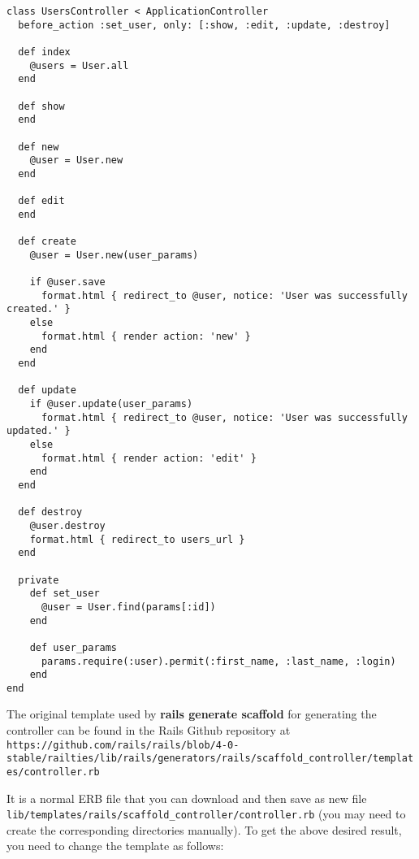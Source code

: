 \documentclass[a4paper]{book}
\newcounter{tab}[chapter]
\begin{document}
\begin{shaded}\begin{verbatim}
class UsersController < ApplicationController
  before_action :set_user, only: [:show, :edit, :update, :destroy]

  def index
    @users = User.all
  end

  def show
  end

  def new
    @user = User.new
  end

  def edit
  end

  def create
    @user = User.new(user_params)

    if @user.save
      format.html { redirect_to @user, notice: 'User was successfully created.' }
    else
      format.html { render action: 'new' }
    end
  end

  def update
    if @user.update(user_params)
      format.html { redirect_to @user, notice: 'User was successfully updated.' }
    else
      format.html { render action: 'edit' }
    end
  end

  def destroy
    @user.destroy
    format.html { redirect_to users_url }
  end

  private
    def set_user
      @user = User.find(params[:id])
    end

    def user_params
      params.require(:user).permit(:first_name, :last_name, :login)
    end
end
\end{verbatim}\end{shaded}

The original template used by \textbf{rails generate scaffold} for generating the controller can be found in the Rails Github repository at \texttt{https://github.com/rails/rails/blob/4-0-stable/railties/lib/rails/generators/rails/scaffold\_controller/templates/controller.rb}

It is a normal ERB file that you can download and then save as new file \texttt{lib/templates/rails/scaffold\_controller/controller.rb} (you may need to create the corresponding directories manually). To get the above desired result, you need to change the template as follows:
\end{document}
